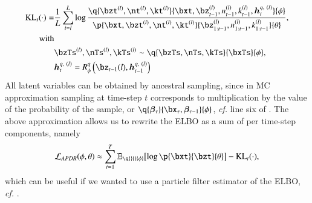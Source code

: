 \begin{equation}
\begin{aligned}
    \operatorname{KL}_t(\cdot) = &\frac{1}{L} \sum_{i=l}^L \log{\frac{ \q{\bzt^{(l)}, \nt^{(l)}, \kt^{(l)}}{\bxt, \bz_{t-1}^{(l)}, n_{t-1}^{(l)}, k_{t-1}^{(l)}, \bm{h}_t^{q,\ (l)}}{\phi} }{ \p{\bxt, \bzt^{(l)}, \nt^{(l)}, \kt^{(l)}}{\bz_{1:t-1}^{(l)}, n_{1:t-1}^{(l)}, k_{1:t-1}^{(l)}}{\theta} }},\\
%    
    \text{with}\\
%    
    &\bzTs^{(l)}, \nTs^{(l)}, \kTs^{(l)} \sim \q{\bzTs, \nTs, \kTs}{\bxTs}{\phi},\\
%    
    &\bm{h}_t^{q,\ (l)} = R^q_\phi \left( \bz_{t-1}{(l)}, \bm{h}_{t-1}^{q,\ (l)} \right)
\end{aligned}
\end{equation}
All latent variables can be obtained by ancestral sampling, since in MC approximation sampling at time-step $t$ corresponds to multiplication by the value of the probability of the sample, or $\q{\bm{\beta}_\tau}{\bx_\tau, \bm{\beta}_{\tau-1}}{\phi}$, \emph{cf.} line six of .
The above approximation allows us to rewrite the ELBO as a sum of per time-step components, namely
\begin{equation}
    \loss[APDR]{\phi, \theta} \approx \sum_{t=1}^T \expc{ \log \p{\bxt}{\bzt}{\theta} }{}{ \q{}{}{\phi} } - \operatorname{KL}_t(\cdot),
\end{equation}
which can be useful if we wanted to use a particle filter estimator of the ELBO, \emph{cf.} .

